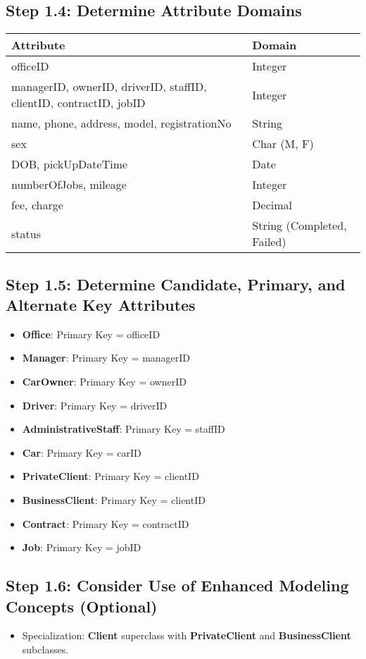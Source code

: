\documentclass[a4paper,12pt]{article}
\begin{document}
\subsection*{Step 1.4: Determine Attribute Domains}
\begin{table}[ht]
\centering
\begin{tabularx}{\textwidth}{|X|X|}
\hline
\rowcolor{blue!20} \textbf{Attribute} & \textbf{Domain} \\
\hline
officeID & Integer \\
managerID, ownerID, driverID, staffID, clientID, contractID, jobID & Integer \\
name, phone, address, model, registrationNo & String \\
sex & Char (M, F) \\
DOB, pickUpDateTime & Date \\
numberOfJobs, mileage & Integer \\
fee, charge & Decimal \\
status & String (Completed, Failed) \\
\hline
\end{tabularx}
\end{table}

\subsection*{Step 1.5: Determine Candidate, Primary, and Alternate Key Attributes}
\begin{itemize}
    \item \textbf{Office}: Primary Key = officeID
    \item \textbf{Manager}: Primary Key = managerID
    \item \textbf{CarOwner}: Primary Key = ownerID
    \item \textbf{Driver}: Primary Key = driverID
    \item \textbf{AdministrativeStaff}: Primary Key = staffID
    \item \textbf{Car}: Primary Key = carID
    \item \textbf{PrivateClient}: Primary Key = clientID
    \item \textbf{BusinessClient}: Primary Key = clientID
    \item \textbf{Contract}: Primary Key = contractID
    \item \textbf{Job}: Primary Key = jobID
\end{itemize}

\subsection*{Step 1.6: Consider Use of Enhanced Modeling Concepts (Optional)}
\begin{itemize}
    \item Specialization: \textbf{Client} superclass with \textbf{PrivateClient} and \textbf{BusinessClient} subclasses.
\end{itemize}
\end{document}
